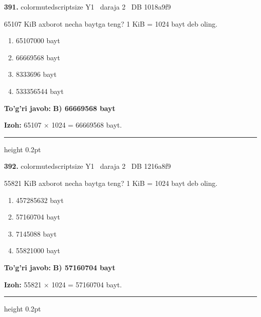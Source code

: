 \documentclass[10pt,a4paper,oneside]{article}
\begin{document}
\noindent\textbf{\color{ink}391.}  {color{muted}scriptsize Y1 \textbullet\ daraja 2 \textbullet\ DB 1018a9f9}
\par
65107 KiB axborot necha baytga teng? 1 KiB = 1024 bayt deb oling.
\begin{enumerate}[label=\Alph*),leftmargin=9mm]
\item 65107000 bayt
\item 66669568 bayt
\item 8333696 bayt
\item 533356544 bayt
\end{enumerate}
\begin{tcolorbox}[enhanced,breakable,colback=teal!4,colframe=teal!50!black,boxrule=0.5pt,arc=1.1mm,left=3mm,right=3mm,top=1.7mm,bottom=1.7mm,before skip=2mm,after skip=2mm]
\textbf{\color{teal}To'g'ri javob:} \textbf{B) 66669568 bayt}
\par\smallskip
\textbf{Izoh:} 65107 \ensuremath{\times} 1024 = 66669568 bayt.
\end{tcolorbox}
\vspace{2mm}\hrule height 0.2pt \vspace{3mm}

\noindent\textbf{\color{ink}392.}  {color{muted}scriptsize Y1 \textbullet\ daraja 2 \textbullet\ DB 1216a8f9}
\par
55821 KiB axborot necha baytga teng? 1 KiB = 1024 bayt deb oling.
\begin{enumerate}[label=\Alph*),leftmargin=9mm]
\item 457285632 bayt
\item 57160704 bayt
\item 7145088 bayt
\item 55821000 bayt
\end{enumerate}
\begin{tcolorbox}[enhanced,breakable,colback=teal!4,colframe=teal!50!black,boxrule=0.5pt,arc=1.1mm,left=3mm,right=3mm,top=1.7mm,bottom=1.7mm,before skip=2mm,after skip=2mm]
\textbf{\color{teal}To'g'ri javob:} \textbf{B) 57160704 bayt}
\par\smallskip
\textbf{Izoh:} 55821 \ensuremath{\times} 1024 = 57160704 bayt.
\end{tcolorbox}
\vspace{2mm}\hrule height 0.2pt \vspace{3mm}
\end{document}
